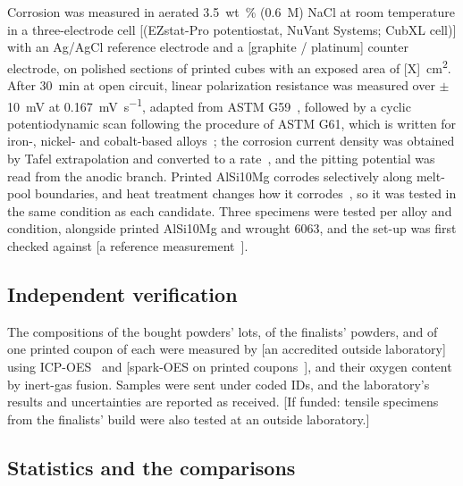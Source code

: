 \documentclass[preprint,12pt]{elsarticle}
\newcommand{\note}[1]{}
\newcommand{\note}[1]{\textcolor{blue!70!black}{\textsf{\footnotesize [Note: #1]}}}
\newcommand{\placeholder}[1]{\textcolor{red!75!black}{[#1]}}
\newcommand{\AlSi}{AlSi10Mg\xspace}
\begin{document}
Corrosion was measured in aerated \SI{3.5}{wt\%} (\SI{0.6}{M}) NaCl at room temperature in a three-electrode cell \placeholder{(EZstat-Pro potentiostat, NuVant Systems; CubXL cell)} with an Ag/AgCl reference electrode and a \placeholder{graphite / platinum} counter electrode, on polished sections of printed cubes with an exposed area of \placeholder{X}~cm\textsuperscript{2}.
After \SI{30}{min} at open circuit, linear polarization resistance was measured over $\pm$\SI{10}{mV} at \SI{0.167}{mV\per s}, adapted from ASTM G59~\cite{astm_g59}, followed by a cyclic potentiodynamic scan following the procedure of ASTM G61, which is written for iron-, nickel- and cobalt-based alloys~\cite{astm_g61}; the corrosion current density was obtained by Tafel extrapolation and converted to a rate~\cite{astm_g102}, and the pitting potential was read from the anodic branch.
Printed \AlSi corrodes selectively along melt-pool boundaries, and heat treatment changes how it corrodes~\cite{cabrini2016,revilla2017,rubben2019}, so it was tested in the same condition as each candidate. Three specimens were tested per alloy and condition, alongside printed \AlSi and wrought 6063, and the set-up was first checked against \placeholder{a reference measurement~\cite{astm_g5}}.
\note{The instrument has so far passed dummy-cell checks only (PR \#239), EZware caps the open-circuit step at 20~min, and only one reference electrode is on order (PR \#264).}

\subsection{Independent verification}
\label{sec:verification}

The compositions of the bought powders' lots, of the finalists' powders, and of one printed coupon of each were measured by \placeholder{an accredited outside laboratory} using ICP-OES~\cite{astm_e3061} and \placeholder{spark-OES on printed coupons~\cite{astm_e1251}}, and their oxygen content by inert-gas fusion.
Samples were sent under coded IDs, and the laboratory's results and uncertainties are reported as received.
\placeholder{If funded: tensile specimens from the finalists' build were also tested at an outside laboratory.}

\subsection{Statistics and the comparisons}
\label{sec:stats}
\end{document}
